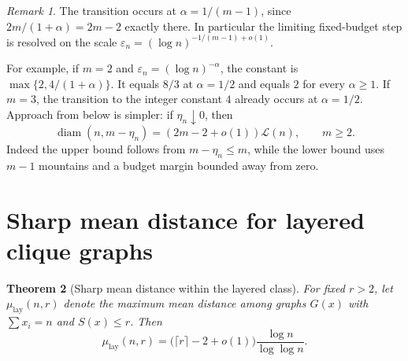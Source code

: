 \documentclass[11pt]{amsart}
\newtheorem{theorem}{Theorem}[section]
\theoremstyle{definition}
\theoremstyle{remark}
\newtheorem{remark}[theorem]{Remark}
\newcommand{\diam}{\operatorname{diam}}
\newcommand{\Lz}{\mathcal{L}}
\begin{document}
\begin{remark}
The transition occurs at $\alpha=1/(m-1)$, since
$2m/(1+\alpha)=2m-2$ exactly there.  In particular the limiting fixed-budget
step is resolved on the scale
$\varepsilon_n=(\log n)^{-1/(m-1)+o(1)}$.
\end{remark}

For example, if $m=2$ and $\varepsilon_n=(\log n)^{-\alpha}$, the
constant is $\max\{2,4/(1+\alpha)\}$. It equals $8/3$ at $\alpha=1/2$
and equals $2$ for every $\alpha\ge1$. If $m=3$, the transition to
the integer constant $4$ already occurs at $\alpha=1/2$.
Approach from below is simpler: if $\eta_n\downarrow0$, then
\[
 \diam(n,m-\eta_n)=(2m-2+o(1))\Lz(n),\qquad m\ge2.
\]
Indeed the upper bound follows from $m-\eta_n\le m$, while the lower
bound uses $m-1$ mountains and a budget margin bounded away from zero.
\section{Sharp mean distance for layered clique graphs}
\begin{theorem}[Sharp mean distance within the layered class]\label{thm:layermean}
For fixed $r>2$, let $\mu_{\mathrm{lay}}(n,r)$ denote the maximum mean distance
among graphs $G(x)$ with $\sum x_i=n$ and $S(x)\le r$. Then
\[
\mu_{\mathrm{lay}}(n,r)
 =\bigl(\lceil r\rceil-2+o(1)\bigr)
   \frac{\log n}{\log\log n}.
\]
\end{theorem}
\end{document}
